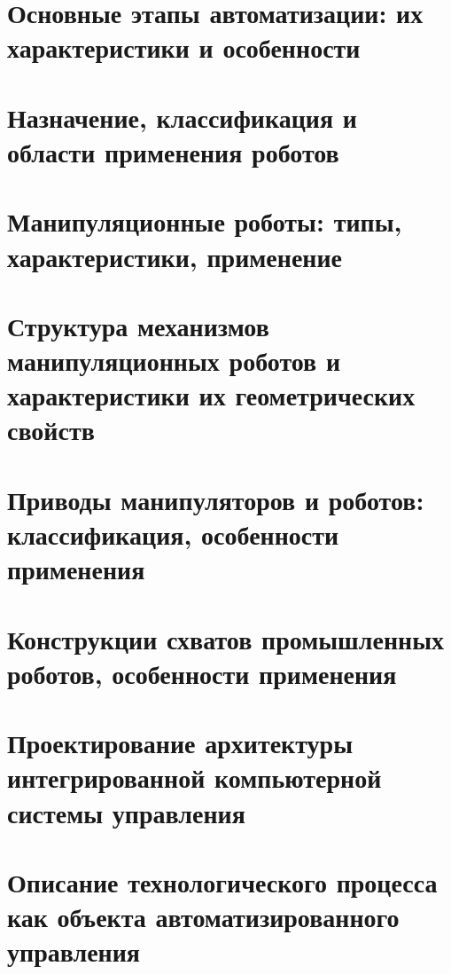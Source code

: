 \documentclass[unicode, 12pt, a4paper, oneside]{article}
\begin{document}
\section{Основные этапы автоматизации:  их характеристики и особенности}


\section{Назначение, классификация и области применения роботов}

\section{Манипуляционные роботы: типы, характеристики, применение}

\section{Структура механизмов манипуляционных роботов и характеристики их геометрических свойств}

\section{Приводы манипуляторов и роботов: классификация, особенности применения}

\section{Конструкции схватов промышленных роботов, особенности применения}

\section{Проектирование  архитектуры интегрированной компьютерной системы управления }

\section{Описание технологического процесса как объекта автоматизированного управления }
\end{document}
